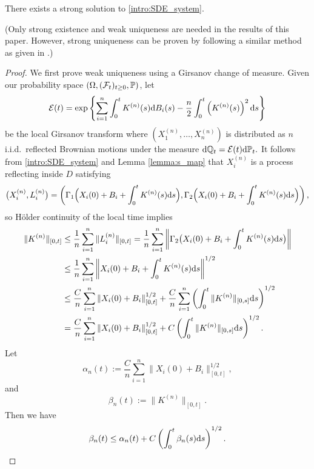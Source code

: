 \begin{theorem}\label{th:existence_system}
	There exists a strong solution to \eqref{intro:SDE_system}.
\end{theorem}
\begin{remark}
	(Only strong existence and weak uniqueness are needed in the results of this paper. However, strong uniqueness can be proven by following a similar method as given in \cite[Section 3]{bass2010stationary}.)

\end{remark}
\begin{proof}
	We first prove weak uniqueness using a Girsanov change of measure. Given our probability space $(\Omega, (\mathcal{F}_t)_{t \geq 0}, \mathbb{P})$, let
	\[
	\mathcal{E}(t) = \exp\left\{\sum_{i = 1}^n\int_0^tK^{(n)}(s)\mathrm{d} B_i(s) - \frac{n}{2}\int_0^t\left(K^{(n)}(s)\right)^2\mathrm{d} s\right\}
	\]
	be the local Girsanov transform where $(X_1^{(n)}, \dots, X_n^{(n)})$ is distributed as $n$ i.i.d.\ reflected Brownian motions under the measure $\mathrm{d} \mathbb{Q}_t = \mathcal{E}(t)\mathrm{d} \mathbb{P}_t.$
It follows from \eqref{intro:SDE_system} and Lemma \ref{lemma:s_map} that $X_i^{(n)}$ is a process reflecting inside $D$ satisfying
	\[
	\big(X_i^{(n)}, L_i^{(n)}\big) = \left(\Gamma_1\Big(X_i(0) + B_i + \int_0^tK^{(n)}(s) \mathrm{d} s\Big), \Gamma_2\Big(X_i(0) + B_i + \int_0^tK^{(n)}(s) \mathrm{d} s\Big)\right),
	\] so H\"{o}lder continuity of the local time implies
	\begin{align}
		\begin{split}\label{eq:Gronwall}
			\|K^{(n)}\|_{[0, t]} &\leq \frac{1}{n}\sum_{i=1}^n\|L_i^{(n)}\|_{[0, t]}
			= \frac{1}{n}\sum_{i=1}^n\left\|\Gamma_2\big(X_i(0) + B_i + \int_0^tK^{(n)}(s) \mathrm{d} s\big)\right\|\\
			&\leq \frac{1}{n}\sum_{i=1}^n\left\|X_i(0) + B_i + \int_0^tK^{(n)}(s) \mathrm{d} s\right\|^{1/2}\\
			&\leq \frac{C}{n}\sum_{i=1}^n\|X_i(0) + B_i\|_{[0, t]}^{1/2} + \frac{C}{n}\sum_{i = 1}^n\left(\int_0^t\|K^{(n)}\|_{[0, s]}\mathrm{d} s\right)^{1/2}\\
			&= \frac{C}{n}\sum_{i=1}^n\|X_i(0) + B_i\|_{[0, t]}^{1/2} + C\left(\int_0^t\|K^{(n)}\|_{[0, s]}\mathrm{d} s\right)^{1/2}.
		\end{split}
	\end{align}
	Let 
	\[\alpha_n(t) :=  \frac{C}{n}\sum_{i=1}^n\|X_i(0) + B_i\|_{[0, t]}^{1/2},
	\] and 
	\[\beta_n(t) := \|K^{(n)}\|_{[0, t]}.\]
	Then we have
	\[
	\beta_n(t) \leq \alpha_n(t) + C\left(\int_0^t\beta_n(s) \mathrm{d} s\right)^{1/2}.
\]
\end{proof}
